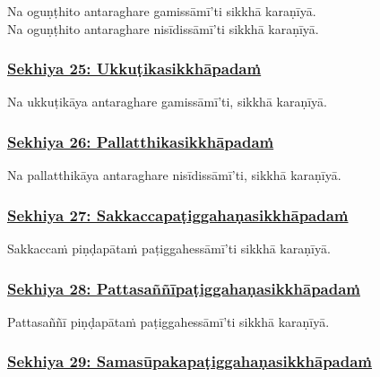 Na oguṇṭhito antaraghare gamissāmī'ti sikkhā karaṇīyā.\\
Na oguṇṭhito antaraghare nisīdissāmī'ti sikkhā karaṇīyā.



\subsubsection*{\hyperref[training25]{Sekhiya 25: Ukkuṭikasikkhāpadaṁ}}
\label{sekh25}

Na ukkuṭikāya antaraghare gamissāmī'ti, sikkhā karaṇīyā.



\subsubsection*{\hyperref[training26]{Sekhiya 26: Pallatthikasikkhāpadaṁ}}
\label{sekh26}

Na pallatthikāya antaraghare nisīdissāmī'ti, sikkhā karaṇīyā.\makeatletter\hyperlink{endnote479-appendix}\makeatother \thinspace



\subsubsection*{\hyperref[training27]{Sekhiya 27: Sakkaccapaṭiggahaṇasikkhāpadaṁ}}
\label{sekh27}

Sakkaccaṁ piṇḍapātaṁ paṭiggahessāmī'ti sikkhā karaṇīyā.



\subsubsection*{\hyperref[training28]{Sekhiya 28: Pattasaññīpaṭiggahaṇasikkhāpadaṁ}}
\label{sekh28}

Pattasaññī piṇḍapātaṁ paṭiggahessāmī'ti sikkhā karaṇīyā.



\subsubsection*{\hyperref[training29]{Sekhiya 29: Samasūpakapaṭiggahaṇasikkhāpadaṁ}}
\label{sekh29}

